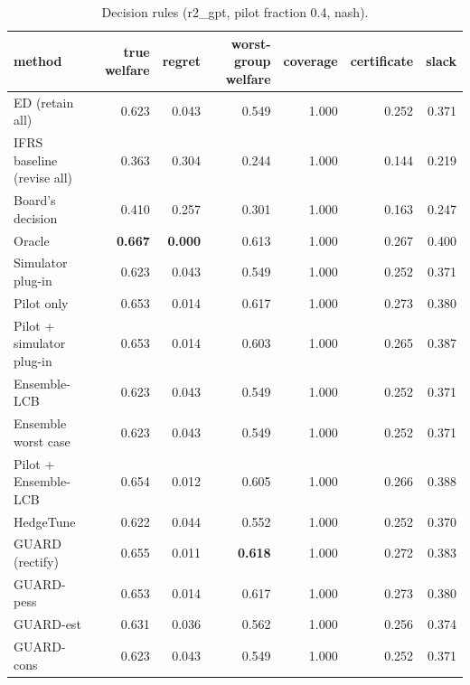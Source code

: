 \begin{table}[t]
\centering
\small
\begin{tabular}{lrrrrrr}
\toprule
method & true welfare & regret & worst-group welfare & coverage & certificate & slack \\
\midrule
ED (retain all) & 0.623 & 0.043 & 0.549 & 1.000 & 0.252 & 0.371 \\
IFRS baseline (revise all) & 0.363 & 0.304 & 0.244 & 1.000 & 0.144 & 0.219 \\
Board's decision & 0.410 & 0.257 & 0.301 & 1.000 & 0.163 & 0.247 \\
Oracle & \textbf{0.667} & \textbf{0.000} & 0.613 & 1.000 & 0.267 & 0.400 \\
Simulator plug-in & 0.623 & 0.043 & 0.549 & 1.000 & 0.252 & 0.371 \\
Pilot only & 0.653 & 0.014 & 0.617 & 1.000 & 0.273 & 0.380 \\
Pilot + simulator plug-in & 0.653 & 0.014 & 0.603 & 1.000 & 0.265 & 0.387 \\
Ensemble-LCB & 0.623 & 0.043 & 0.549 & 1.000 & 0.252 & 0.371 \\
Ensemble worst case & 0.623 & 0.043 & 0.549 & 1.000 & 0.252 & 0.371 \\
Pilot + Ensemble-LCB & 0.654 & 0.012 & 0.605 & 1.000 & 0.266 & 0.388 \\
HedgeTune & 0.622 & 0.044 & 0.552 & 1.000 & 0.252 & 0.370 \\
GUARD (rectify) & 0.655 & 0.011 & \textbf{0.618} & 1.000 & 0.272 & 0.383 \\
GUARD-pess & 0.653 & 0.014 & 0.617 & 1.000 & 0.273 & 0.380 \\
GUARD-est & 0.631 & 0.036 & 0.562 & 1.000 & 0.256 & 0.374 \\
GUARD-cons & 0.623 & 0.043 & 0.549 & 1.000 & 0.252 & 0.371 \\
\bottomrule
\end{tabular}
\caption{Decision rules (r2\_gpt, pilot fraction 0.4, nash).}
\label{tab:methods-nash}
\end{table}

